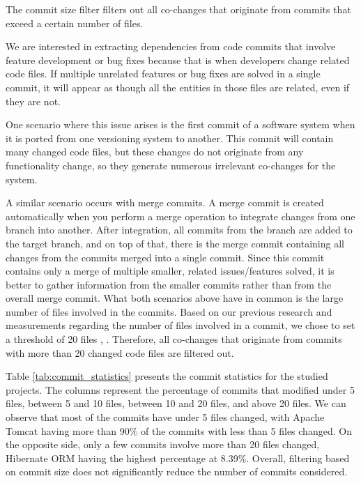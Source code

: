 \documentclass{ieeeaccess}
\begin{document}
The commit size filter filters out all co-changes that originate from commits that exceed a certain number of files.

We are interested in extracting dependencies from code commits that involve feature development or bug fixes because that is when developers change related code files. If multiple unrelated features or bug fixes are solved in a single commit, it will appear as though all the entities in those files are related, even if they are not.

One scenario where this issue arises is the first commit of a software system when it is ported from one versioning system to another. This commit will contain many changed code files, but these changes do not originate from any functionality change, so they generate numerous irrelevant co-changes for the system.

A similar scenario occurs with merge commits. A merge commit is created automatically when you perform a merge operation to integrate changes from one branch into another. After integration, all commits from the branch are added to the target branch, and on top of that, there is the merge commit containing all changes from the commits merged into a single commit. Since this commit contains only a merge of multiple smaller, related issues/features solved, it is better to gather information from the smaller commits rather than from the overall merge commit.
What both scenarios above have in common is the large number of files involved in the commits. Based on our previous research and measurements regarding the number of files involved in a commit, we chose to set a threshold of 20 files \cite{b4}, \cite{b5}. Therefore, all co-changes that originate from commits with more than 20 changed code files are filtered out.


Table \ref{tab:commit_statistics} presents the commit statistics for the studied projects. The columns represent the percentage of commits that modified under 5 files, between 5 and 10 files, between 10 and 20 files, and above 20 files. We can observe that most of the commits have under 5 files changed, with Apache Tomcat having more than 90\% of the commits with less than 5 files changed. On the opposite side, only a few commits involve more than 20 files changed, Hibernate ORM having the highest percentage at 8.39\%. Overall, filtering based on commit size does not significantly reduce the number of commits considered.
\end{document}
